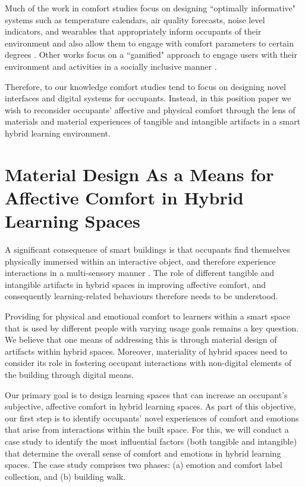 \documentclass[acmconf, anonymous, review]{acmart}
\begin{document}
Much of the work in comfort studies focus on designing ``optimally informative" systems such as temperature calendars, air quality forecasts, noise level indicators, and wearables that appropriately inform occupants of their environment and also allow them to engage with comfort parameters to certain degrees  \cite{costanza2016bit, milenkovic2013improving, kim2020designing}. Other works focus on a ``gamified" approach to engage users with their environment and activities in a socially inclusive manner \cite{mathur2015tiny, kwallek1997impact, zhong2022augmenting}. 

Therefore, to our knowledge comfort studies tend to focus on designing novel interfaces and digital systems for occupants. Instead, in this position paper we wish to reconsider occupants' affective and physical comfort through the lens of materials and material experiences of tangible and intangible artifacts in a smart hybrid learning environment. 


\section{Material Design As a Means for Affective Comfort in Hybrid Learning Spaces}

A significant consequence of smart buildings is that occupants find themselves physically immersed within an interactive object, and therefore experience interactions in a multi-sensory manner \cite{nembrini2017human}. The role of different tangible and intangible artifacts in hybrid spaces in improving affective comfort, and consequently learning-related behaviours therefore needs to be understood.  

Providing for physical and emotional comfort to learners within a smart space that is used by different people with varying usage goals remains a key question. We believe that one means of addressing this is through material design of artifacts within hybrid spaces. Moreover, materiality of hybrid spaces need to consider its role in fostering occupant interactions with non-digital elements of the building through digital means. 

Our primary goal is to design learning spaces that can increase an occupant's subjective, affective comfort in hybrid learning spaces. As part of this objective, our first step is to identify occupants' novel experiences of comfort and emotions that arise from interactions within the built space. For this, we will conduct a case study to identify the most influential factors (both tangible and intangible) that determine the overall sense of comfort and emotions in hybrid learning spaces. The case study comprises two phases: (a) emotion and comfort label collection, and (b) building walk. 
\end{document}
